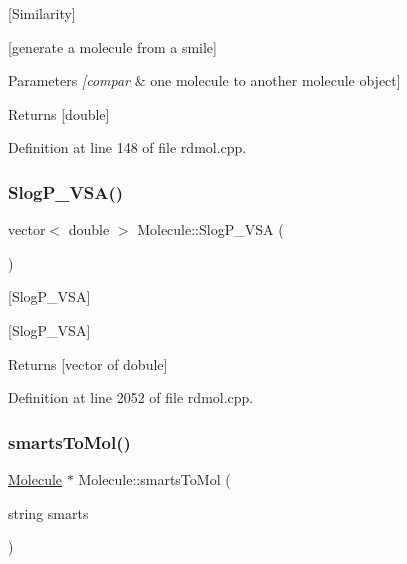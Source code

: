 \mbox{[}Similarity\mbox{]} 

\mbox{[}generate a molecule from a smile\mbox{]}


\begin{DoxyParams}{Parameters}
{\em \mbox{[}compar} & one molecule to another molecule object\mbox{]} \\
\hline
\end{DoxyParams}
\begin{DoxyReturn}{Returns}
\mbox{[}double\mbox{]} 
\end{DoxyReturn}


Definition at line 148 of file rdmol.\+cpp.

\mbox{\label{class_molecule_aaf27b23a3849ca9ec2cf2df6ee591244}} 
\subsubsection{\texorpdfstring{Slog\+P\+\_\+\+V\+S\+A()}{SlogP\_VSA()}}
{\footnotesize\ttfamily vector$<$ double $>$ Molecule\+::\+Slog\+P\+\_\+\+V\+SA (\begin{DoxyParamCaption}{ }\end{DoxyParamCaption})}



\mbox{[}Slog\+P\+\_\+\+V\+SA\mbox{]} 

\mbox{[}Slog\+P\+\_\+\+V\+SA\mbox{]}

\begin{DoxyReturn}{Returns}
\mbox{[}vector of dobule\mbox{]} 
\end{DoxyReturn}


Definition at line 2052 of file rdmol.\+cpp.

\mbox{\label{class_molecule_a628d6859f22b76a102d11674ef461923}} 
\subsubsection{\texorpdfstring{smarts\+To\+Mol()}{smartsToMol()}}
{\footnotesize\ttfamily \mbox{\hyperlink{class_molecule}{Molecule}} $\ast$ Molecule\+::smarts\+To\+Mol (\begin{DoxyParamCaption}\item[{string}]{smarts }\end{DoxyParamCaption})\hspace{0.3cm}{\ttfamily [static]}}




